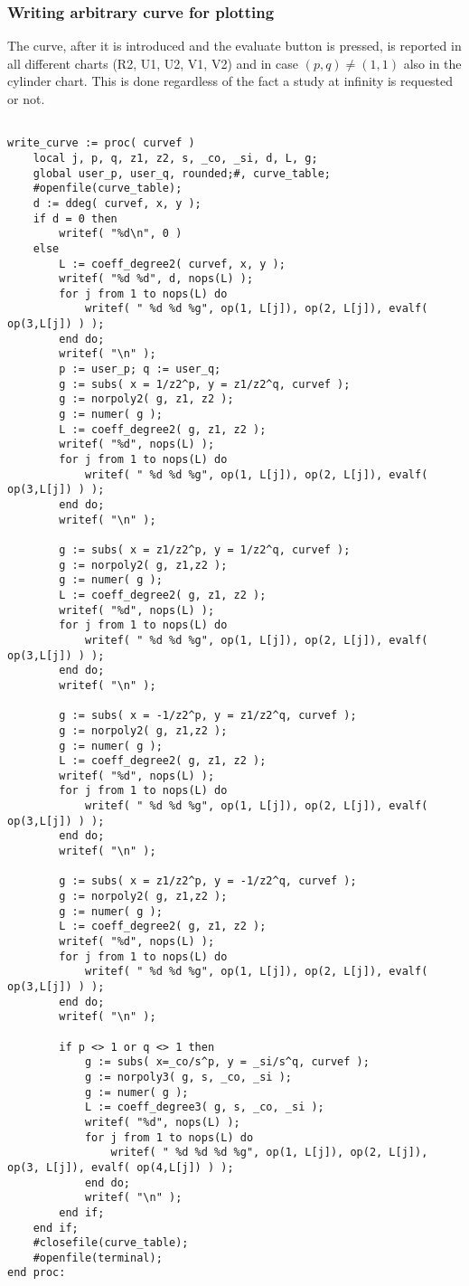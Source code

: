 \documentclass[a4paper,10pt]{article}
\begin{document}
\subsubsection{Writing arbitrary curve for plotting}

The curve, after it is introduced and the evaluate button is pressed, is reported in all different charts (R2, U1, U2, V1, V2) and in case $(p,q)\not=(1,1)$ also in the cylinder chart.  This is done regardless of the fact a study at infinity is requested or not.

\begin{lstlisting}[name=writelog2]

write_curve := proc( curvef )
    local j, p, q, z1, z2, s, _co, _si, d, L, g;
    global user_p, user_q, rounded;#, curve_table;
    #openfile(curve_table);        
    d := ddeg( curvef, x, y );
    if d = 0 then
        writef( "%d\n", 0 )
    else
        L := coeff_degree2( curvef, x, y );
        writef( "%d %d", d, nops(L) );
        for j from 1 to nops(L) do
            writef( " %d %d %g", op(1, L[j]), op(2, L[j]), evalf( op(3,L[j]) ) );
        end do;
        writef( "\n" );
        p := user_p; q := user_q;
        g := subs( x = 1/z2^p, y = z1/z2^q, curvef );
        g := norpoly2( g, z1, z2 );
        g := numer( g );
        L := coeff_degree2( g, z1, z2 );
        writef( "%d", nops(L) );
        for j from 1 to nops(L) do
            writef( " %d %d %g", op(1, L[j]), op(2, L[j]), evalf( op(3,L[j]) ) );
        end do;
        writef( "\n" );

        g := subs( x = z1/z2^p, y = 1/z2^q, curvef );
        g := norpoly2( g, z1,z2 );
        g := numer( g );
        L := coeff_degree2( g, z1, z2 );
        writef( "%d", nops(L) );
        for j from 1 to nops(L) do
            writef( " %d %d %g", op(1, L[j]), op(2, L[j]), evalf( op(3,L[j]) ) );
        end do;
        writef( "\n" );

        g := subs( x = -1/z2^p, y = z1/z2^q, curvef );
        g := norpoly2( g, z1,z2 );
        g := numer( g );
        L := coeff_degree2( g, z1, z2 );
        writef( "%d", nops(L) );
        for j from 1 to nops(L) do
            writef( " %d %d %g", op(1, L[j]), op(2, L[j]), evalf( op(3,L[j]) ) );
        end do;
        writef( "\n" );

        g := subs( x = z1/z2^p, y = -1/z2^q, curvef );
        g := norpoly2( g, z1,z2 );
        g := numer( g );
        L := coeff_degree2( g, z1, z2 );
        writef( "%d", nops(L) );
        for j from 1 to nops(L) do
            writef( " %d %d %g", op(1, L[j]), op(2, L[j]), evalf( op(3,L[j]) ) );
        end do;
        writef( "\n" );

        if p <> 1 or q <> 1 then
            g := subs( x=_co/s^p, y = _si/s^q, curvef );
            g := norpoly3( g, s, _co, _si );
            g := numer( g );
            L := coeff_degree3( g, s, _co, _si );
            writef( "%d", nops(L) );
            for j from 1 to nops(L) do
                writef( " %d %d %d %g", op(1, L[j]), op(2, L[j]), op(3, L[j]), evalf( op(4,L[j]) ) );
            end do;
            writef( "\n" );
        end if;
    end if;
    #closefile(curve_table);
    #openfile(terminal);
end proc:
\end{lstlisting}
\end{document}
